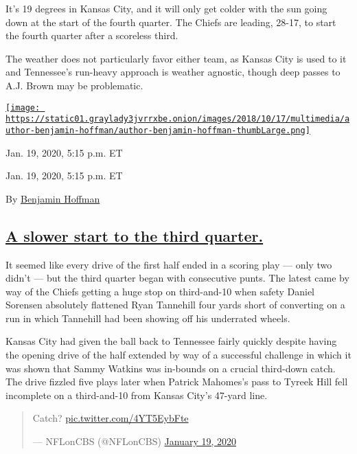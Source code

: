 It's 19 degrees in Kansas City, and it will only get colder with the sun
going down at the start of the fourth quarter. The Chiefs are leading,
28-17, to start the fourth quarter after a scoreless third.

The weather does not particularly favor either team, as Kansas City is
used to it and Tennessee's run-heavy approach is weather agnostic,
though deep passes to A.J. Brown may be problematic.

\href{https://www.nytimes3xbfgragh.onion/by/benjamin-hoffman}{\texttt{[image: https://static01.graylady3jvrrxbe.onion/images/2018/10/17/multimedia/author-benjamin-hoffman/author-benjamin-hoffman-thumbLarge.png]}}

Jan. 19, 2020, 5:15 p.m. ET

Jan. 19, 2020, 5:15 p.m. ET

By
\href{https://www.nytimes3xbfgragh.onion/by/benjamin-hoffman}{Benjamin
Hoffman}

\hypertarget{a-slower-start-to-the-third-quarter}{%
\subsection{\texorpdfstring{\protect\hyperlink{a-slower-start-to-the-third-quarter}{A
slower start to the third
quarter.}}{A slower start to the third quarter.}}\label{a-slower-start-to-the-third-quarter}}

It seemed like every drive of the first half ended in a scoring play ---
only two didn't --- but the third quarter began with consecutive punts.
The latest came by way of the Chiefs getting a huge stop on third-and-10
when safety Daniel Sorensen absolutely flattened Ryan Tannehill four
yards short of converting on a run in which Tannehill had been showing
off his underrated wheels.

Kansas City had given the ball back to Tennessee fairly quickly despite
having the opening drive of the half extended by way of a successful
challenge in which it was shown that Sammy Watkins was in-bounds on a
crucial third-down catch. The drive fizzled five plays later when
Patrick Mahomes's pass to Tyreek Hill fell incomplete on a third-and-10
from Kansas City's 47-yard line.

\begin{quote}
Catch? \href{https://t.co/4YT5EybFte}{pic.twitter.com/4YT5EybFte}

--- NFLonCBS (@NFLonCBS)
\href{https://twitter.com/NFLonCBS/status/1219014699729215490?ref_src=twsrc\%5Etfw}{January
19, 2020}
\end{quote}

